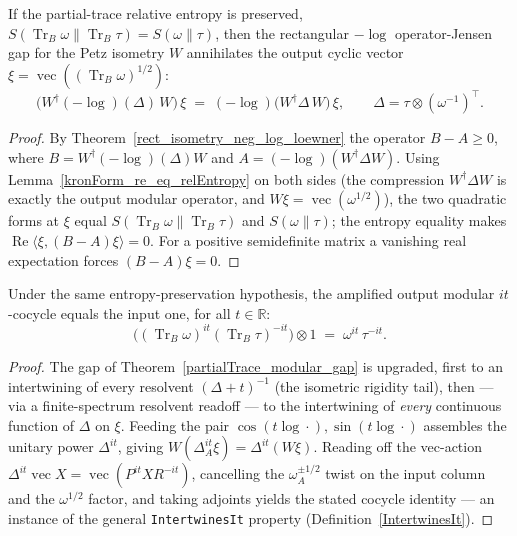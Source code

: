 \begin{theorem}\label{partialTrace_modular_gap}
  \leanok
  If the partial-trace relative entropy is preserved,
  \(S(\operatorname{Tr}_B\omega\|\operatorname{Tr}_B\tau)=S(\omega\|\tau)\), then the rectangular
  \(-\log\) operator-Jensen gap for the Petz isometry \(W\) annihilates the output cyclic vector
  \(\xi=\operatorname{vec}((\operatorname{Tr}_B\omega)^{1/2})\):
  \[
    \bigl(W^{\dagger}(-\log)(\Delta)\,W\bigr)\,\xi
      \;=\; (-\log)\bigl(W^{\dagger}\Delta\,W\bigr)\,\xi,
    \qquad \Delta=\tau\otimes(\omega^{-1})^{\top}.
  \]
\end{theorem}
\begin{proof}\leanok
  By Theorem~\ref{rect_isometry_neg_log_loewner} the operator \(B-A\ge 0\), where
  \(B=W^{\dagger}(-\log)(\Delta)W\) and \(A=(-\log)(W^{\dagger}\Delta W)\). Using
  Lemma~\ref{kronForm_re_eq_relEntropy} on both sides (the compression \(W^{\dagger}\Delta W\) is
  exactly the output modular operator, and \(W\xi=\operatorname{vec}(\omega^{1/2})\)), the two
  quadratic forms at \(\xi\) equal \(S(\operatorname{Tr}_B\omega\|\operatorname{Tr}_B\tau)\) and
  \(S(\omega\|\tau)\); the entropy equality makes
  \(\operatorname{Re}\langle\xi,(B-A)\xi\rangle=0\). For a positive semidefinite matrix a vanishing
  real expectation forces \((B-A)\xi=0\).
\end{proof}

\begin{theorem}\label{partialTrace_equality_imp_intertwinesIt}
  \leanok
  Under the same entropy-preservation hypothesis, the amplified output modular \(it\)-cocycle equals
  the input one, for all \(t\in\mathbb{R}\):
  \[
    \bigl((\operatorname{Tr}_B\omega)^{it}(\operatorname{Tr}_B\tau)^{-it}\bigr)\otimes 1
      \;=\; \omega^{it}\,\tau^{-it}.
  \]
\end{theorem}
\begin{proof}\leanok
  The gap of Theorem~\ref{partialTrace_modular_gap} is upgraded, first to an intertwining of every
  resolvent \((\Delta+t)^{-1}\) (the isometric rigidity tail), then --- via a finite-spectrum
  resolvent readoff --- to the intertwining of \emph{every} continuous function of \(\Delta\) on
  \(\xi\). Feeding the pair \(\cos(t\log\cdot),\sin(t\log\cdot)\) assembles the unitary power
  \(\Delta^{it}\), giving \(W(\Delta_A^{it}\xi)=\Delta^{it}(W\xi)\). Reading off the vec-action
  \(\Delta^{it}\operatorname{vec}X=\operatorname{vec}(P^{it}XR^{-it})\), cancelling the
  \(\omega_A^{\pm 1/2}\) twist on the input column and the \(\omega^{1/2}\) factor, and taking adjoints
  yields the stated cocycle identity --- an instance of the general \texttt{IntertwinesIt} property
  (Definition~\ref{IntertwinesIt}).
\end{proof}

